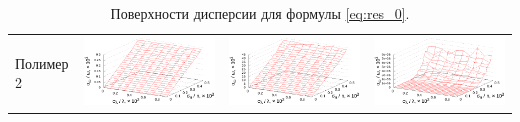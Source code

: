 \documentclass[12pt,a4paper]{article}
\begin{document}
\begin{table}[h]
\begin{tabular}{l | c c c}
	\begin{rotate}{90}Полимер 2\end{rotate} &	\includegraphics[scale=0.4]{figs/even/p2.txt_coeff0.dat.eps} & \includegraphics[scale=0.4]{figs/even/p2.txt_coeff1.dat.eps} & \includegraphics[scale=0.4]{figs/even/p2.txt_coeff2.dat.eps}
  \end{tabular}
  \caption{Поверхности дисперсии для формулы \eqref{eq:res_0}.}
  \label{tabl:res_even}
\end{table}
\end{document}
